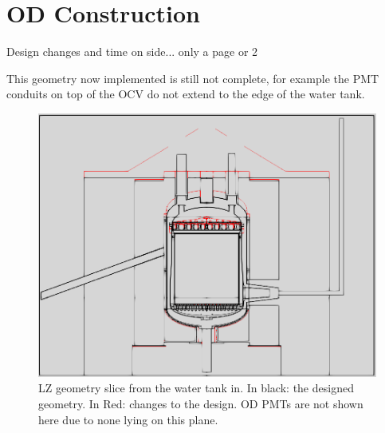 \section{OD Construction}
\par
Design changes and time on side... only a page or 2


\par
This geometry now implemented is still not complete, for example the PMT conduits on top of the OCV do not extend to the edge of the water tank. 

\begin{figure}[!htbp]
\includegraphics[width=\textwidth]{Figures/Construction/geometry_differences.png}
\centering
\caption{LZ geometry slice from the water tank in. In black: the designed geometry. In Red: changes to the design. OD PMTs are not shown here due to none lying on this plane.}
\label{fig:Geometry_Differences}
\end{figure}

